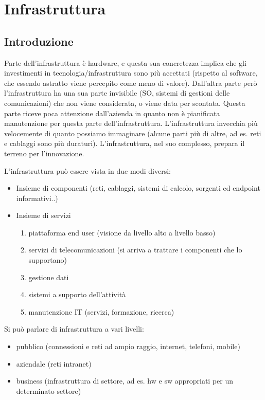 \chapter{Infrastruttura}
\section{Introduzione}
Parte dell'infrastruttura \`e hardware, e questa sua concretezza implica che gli investimenti in tecnologia/infrastruttura sono pi\`u accettati (rispetto al software, che essendo astratto viene percepito come meno di valore).
Dall'altra parte per\`o l'infrastruttura ha una sua parte invisibile (SO, sistemi di gestioni delle comunicazioni) che non viene considerata, o viene data per scontata. Questa parte riceve poca attenzione dall'azienda in quanto non \`e pianificata manutenzione per questa parte dell'infrastruttura.
L'infrastruttura invecchia pi\`u velocemente di quanto possiamo immaginare (alcune parti pi\`u di altre, ad es. reti e cablaggi sono pi\`u duraturi).
L'infrastruttura, nel suo complesso, prepara il terreno per l'innovazione.

L'infrastruttura pu\`o essere vista in due modi diversi:
\begin{itemize}
\item Insieme di componenti (reti, cablaggi, sistemi di calcolo, sorgenti ed endpoint informativi..)
\item Insieme di servizi
  \begin{enumerate}
\item piattaforma end user (visione da livello alto a livello basso)
\item servizi di telecomunicazioni (si arriva a trattare i componenti che lo supportano)
\item gestione dati
\item sistemi a supporto dell'attivit\`a
\item manutenzione IT (servizi, formazione, ricerca)
\end{enumerate}
\end{itemize}

Si pu\`o parlare di infrastruttura a vari livelli:
\begin{itemize}
\item pubblico (connessioni e reti ad ampio raggio, internet, telefoni, mobile)
\item aziendale (reti intranet)
\item business (infrastruttura di settore, ad es. hw e sw appropriati per un determinato settore)
\end{itemize}



